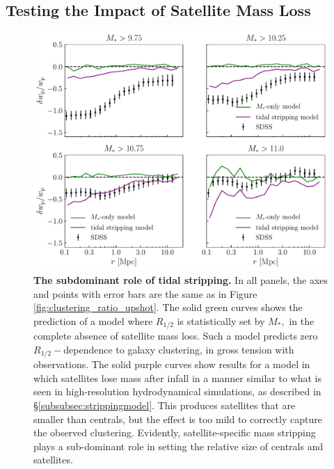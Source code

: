\documentclass[usenatbib,usegraphicx,letterpaper]{mn2e}
\newcommand{\rhalf}{R_{1/2}}
\newcommand{\mstar}{M_{\ast}}
\begin{document}
\subsection{Testing the Impact of Satellite Mass Loss}
\label{subsec:mstar_stripping}
\begin{figure}
\centering
\includegraphics[width=12cm]{FIGS/alt_model_wp_ratios.pdf}
\caption{
{\bf The subdominant role of tidal stripping.}
In all panels, the axes and points with error bars are the same as in Figure \ref{fig:clustering_ratio_upshot}. The solid green curves shows the prediction of a model where $\rhalf$ is statistically set by $\mstar,$ in the complete absence of satellite mass loss. Such a model predicts zero $\rhalf-$dependence to galaxy clustering, in gross tension with observations. The solid purple curves show results for a model in which satellites lose mass after infall in a manner similar to what is seen in high-resolution hydrodynamical simulations, as described in \S\ref{subsubsec:strippingmodel}. This produces satellites that are smaller than centrals, but the effect is too mild to correctly capture the observed clustering. Evidently, satellite-specific mass stripping plays a sub-dominant role in setting the relative size of centrals and satellites.
}
\label{fig:mstarmodelclustering}
\end{figure}
\end{document}
